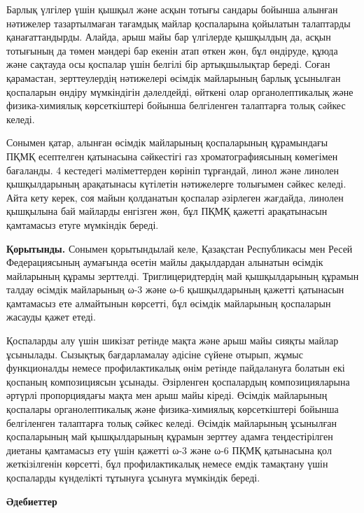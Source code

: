 \begin{multicols}{2}
Барлық үлгілер үшін қышқыл және асқын тотығы сандары бойынша алынған
нәтижелер тазартылмаған тағамдық майлар қоспаларына қойылатын талаптарды
қанағаттандырды. Алайда, арыш майы бар үлгілерде қышқылдың да, асқын
тотығының да төмен мәндері бар екенін атап өткен жөн, бұл өндіруде,
құюда және сақтауда осы қоспалар үшін белгілі бір артықшылықтар береді.
Соған қарамастан, зерттеулердің нәтижелері өсімдік майларының барлық
ұсынылған қоспаларын өндіру мүмкіндігін дәлелдейді, өйткені олар
органолептикалық және физика-химиялық көрсеткіштері бойынша белгіленген
талаптарға толық сәйкес келеді.

Сонымен қатар, алынған өсімдік майларының қоспаларының құрамындағы ПҚМҚ
есептелген қатынасына сәйкестігі газ хроматографиясының көмегімен
бағаланды. 4 кестедегі мәліметтерден көрініп тұрғандай, линол және
линолен қышқылдарының арақатынасы күтілетін нәтижелерге толығымен сәйкес
келеді. Айта кету керек, соя майын қолданатын қоспалар әзірлеген
жағдайда, линолен қышқылына бай майларды енгізген жөн, бұл ПҚМҚ қажетті
арақатынасын қамтамасыз етуге мүмкіндік береді.

{\bfseries Қорытынды.} Сонымен қорытындылай келе, Қазақстан Республикасы
мен Ресей Федерациясының аумағында өсетін майлы дақылдардан алынатын
өсімдік майларының құрамы зерттелді. Триглицеридтердің май қышқылдарының
құрамын талдау өсімдік майларының ω-3 және ω-6 қышқылдарының қажетті
қатынасын қамтамасыз ете алмайтынын көрсетті, бұл өсімдік майларының
қоспаларын жасауды қажет етеді.

Қоспаларды алу үшін шикізат ретінде мақта және арыш майы сияқты майлар
ұсынылады. Сызықтық бағдарламалау әдісіне сүйене отырып, жұмыс
функционалды немесе профилактикалық өнім ретінде пайдалануға болатын екі
қоспаның композициясын ұсынады. Әзірленген қоспалардың композицияларына
әртүрлі пропорциядағы мақта мен арыш майы кіреді. Өсімдік майларының
қоспалары органолептикалық және физика-химиялық көрсеткіштері бойынша
белгіленген талаптарға толық сәйкес келеді. Өсімдік майларының ұсынылған
қоспаларының май қышқылдарының құрамын зерттеу адамға теңдестірілген
диетаны қамтамасыз ету үшін қажетті ω-3 және ω-6 ПҚМҚ қатынасына қол
жеткізілгенін көрсетті, бұл профилактикалық немесе емдік тамақтану үшін
қоспаларды күнделікті тұтынуға ұсынуға мүмкіндік береді.
\end{multicols}

\begin{center}
{\bfseries Әдебиеттер}
\end{center}

